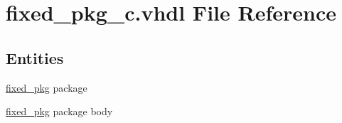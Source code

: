 \hypertarget{fixed__pkg__c_8vhdl}{}\section{fixed\+\_\+pkg\+\_\+c.\+vhdl File Reference}
\label{fixed__pkg__c_8vhdl}
\subsection*{Entities}
\begin{DoxyCompactItemize}
\item 
\hyperlink{classfixed__pkg}{fixed\+\_\+pkg} package
\item 
\hyperlink{class__fixed__pkg}{fixed\+\_\+pkg} package body
\end{DoxyCompactItemize}
